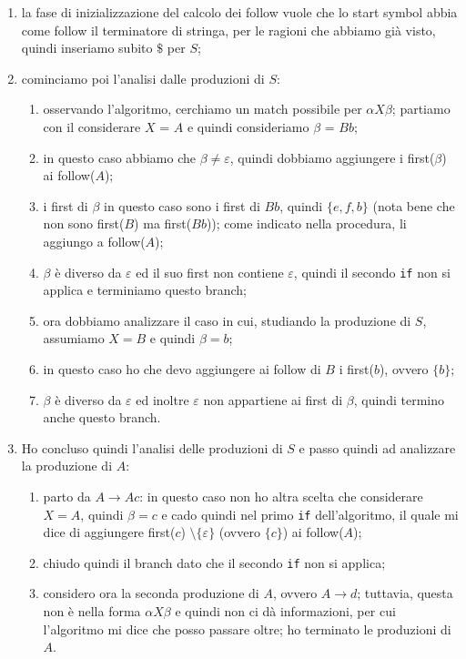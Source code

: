 \documentclass[class=book, crop=false, oneside, 12pt]{standalone}
\begin{document}
\begin{enumerate}
    \item la fase di inizializzazione del calcolo dei follow vuole che lo start symbol abbia come follow il terminatore di stringa, per le ragioni che abbiamo già visto, quindi inseriamo subito \(\$\) per \(S\);
    \item cominciamo poi l'analisi dalle produzioni di \(S\):
    \begin{enumerate}
        \item osservando l'algoritmo, cerchiamo un match possibile per \(\alpha X \beta\); partiamo con il considerare \(X\) = \(A\) e quindi consideriamo \(\beta\) = \(Bb\);
        \item in questo caso abbiamo che \(\beta \neq \varepsilon\), quindi dobbiamo aggiungere i first(\(\beta\)) ai follow(\(A\));
        \item i first di \(\beta\) in questo caso sono i first di \(Bb\), quindi \(\{e, f, b\}\) (nota bene che non sono first(\(B\)) ma first(\(Bb\))); come indicato nella procedura, li aggiungo a follow(\(A\));
        \item \(\beta\) è diverso da \(\varepsilon\) ed il suo first non contiene \(\varepsilon\), quindi il secondo \texttt{if} non si applica e terminiamo questo branch;
        \item ora dobbiamo analizzare il caso in cui, studiando la produzione di \(S\), assumiamo \(X = B\) e quindi \(\beta = b\);
        \item in questo caso ho che devo aggiungere ai follow di \(B\) i first(\(b\)), ovvero \(\{b\}\);
        \item \(\beta\) è diverso da \(\varepsilon\) ed inoltre \(\varepsilon\) non appartiene ai first di \(\beta\), quindi termino anche questo branch.
    \end{enumerate}
    \item Ho concluso quindi l’analisi delle produzioni di \(S\) e passo quindi ad analizzare la produzione di \(A\):
    \begin{enumerate}
        \item parto da \(A \to Ac\): in questo caso non ho altra scelta che considerare \(X = A\), quindi \(\beta = c\) e cado quindi nel primo \texttt{if} dell'algoritmo, il quale mi dice di aggiungere first(\(c\)) \(\setminus \{\varepsilon\}\) (ovvero \(\{c\}\)) ai follow(\(A\));
        \item chiudo quindi il branch dato che il secondo \texttt{if} non si applica;
        \item considero ora la seconda produzione di \(A\), ovvero \(A \to d\); tuttavia, questa non è nella forma \(\alpha X \beta\) e quindi non ci dà informazioni, per cui l'algoritmo mi dice che posso passare oltre; ho terminato le produzioni di \(A\).

\end{enumerate}
\end{enumerate}
\end{document}
